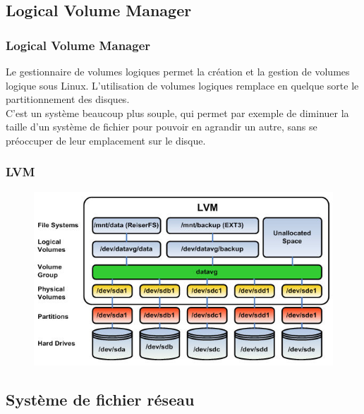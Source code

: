 	\subsection{Logical Volume Manager}
	\begin{frame}
		\frametitle{Logical Volume Manager}
		Le gestionnaire de volumes logiques permet la création et la gestion de volumes logique sous Linux. L'utilisation de volumes logiques remplace en quelque sorte le partitionnement des disques.\\
		
		C'est un système beaucoup plus souple, qui permet par exemple de diminuer la taille d'un système de fichier pour pouvoir en agrandir un autre, sans se préoccuper de leur emplacement sur le disque.\\
		\vspace{10pt}
		
		
	\end{frame}
	\begin{frame}[containsverbatim]
		\frametitle{LVM }
		\begin{figure}[!h]
			\centering
			\includegraphics[scale=0.5]{images/Lvm1}
		\end{figure}
	\end{frame}
	
	\subsection{Système de fichier réseau}
	
